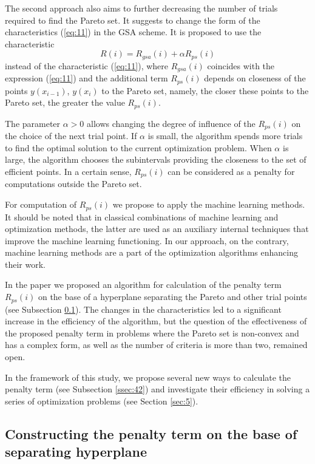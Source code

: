 \documentclass[runningheads]{llncs}
\begin{document}
The second approach also aims to further decreasing the number of trials required to find the Pareto set. It suggests to change the form of the characteristics (\ref{eq:11}) in the GSA scheme. It is proposed to use the characteristic 
\begin{equation}
    \label{eq:16}
    R(i) = R_{gsa} (i) +  \alpha R_{ps} (i)
\end{equation}
instead of the characteristic (\ref{eq:11}), where $R_{gsa}(i)$ coincides with the expression (\ref{eq:11}) and the additional term $R_{ps}(i)$ depends on closeness of the points $y(x_{i-1})$, $y(x_{i})$ to the Pareto set, namely, the closer these points to the Pareto set, the greater the value $R_{ps}(i)$.

The parameter $\alpha > 0$ allows changing the degree of influence of the $R_{ps}(i)$ on the choice of the next trial point. If $\alpha$ is small, the algorithm spends more trials to find the optimal solution to the current optimization problem. When $\alpha$ is large, the algorithm chooses the subintervals providing the closeness to the set of efficient points. In a certain sense, $R_{ps}(i)$ can be considered as a penalty for computations outside the Pareto set.

For computation of $R_{ps}(i)$ we propose to apply the machine learning methods. It should be noted that in classical combinations of machine learning and optimization methods, the latter are used as an auxiliary internal techniques that improve the machine learning functioning. In our approach, on the contrary, machine learning methods are a part of the optimization algorithms enhancing their work.

In the paper \cite{ML_MCO_2023} we proposed an algorithm for calculation of the penalty term $R_{ps}(i)$ on the base of a hyperplane separating the Pareto and other trial points (see Subsection \ref{ssec:41}). The changes in the characteristics led to a significant increase in the efficiency of the algorithm, but the question of the effectiveness of the proposed penalty term in problems where the Pareto set is non-convex and has a complex form, as well as the number of criteria is more than two, remained open.

In the framework of this study, we propose several new ways to calculate the penalty term (see Subsection \ref{ssec:42}) and investigate their efficiency in solving a series of optimization problems (see Section \ref{sec:5}).

\subsection{Constructing the penalty term on the base of separating hyperplane}
\label{ssec:41}
\end{document}
